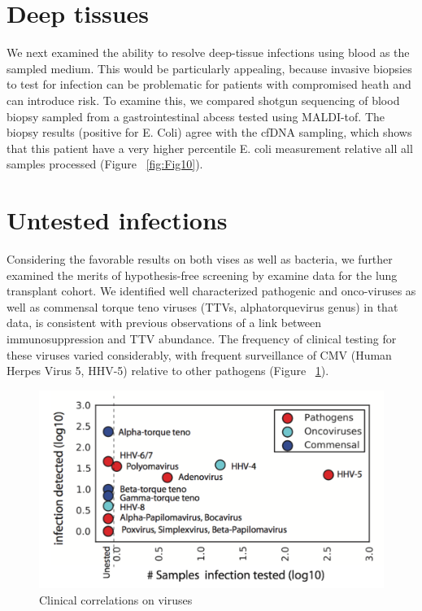 \section{Deep tissues}

We next examined the ability to resolve deep-tissue infections using blood as the sampled medium. This would be particularly appealing, because invasive biopsies to test for infection can be problematic for patients with compromised heath and can introduce risk. To examine this, we compared shotgun sequencing of blood biopsy sampled from a gastrointestinal abcess tested using MALDI-tof. The biopsy results (positive for E. Coli) agree with the cfDNA sampling, which shows that this patient have a very higher percentile E. coli measurement relative all all samples processed (Figure ~\ref{fig:Fig10}).

\section{Untested infections}

Considering the favorable results on both vises as well as bacteria, we further examined the merits of hypothesis-free screening by examine data for the lung transplant cohort. We identified well characterized pathogenic and onco-viruses as well as commensal torque teno viruses (TTVs, alphatorquevirus genus) in that data, is consistent with previous observations of a link between immunosuppression and TTV abundance. The frequency of clinical testing for these viruses varied considerably, with frequent surveillance of CMV (Human Herpes Virus 5, HHV-5) relative to other pathogens (Figure ~\ref{fig:Fig11}). 

\begin{figure}
\center\includegraphics[width=150mm,scale=0.5]{Figures/Fig11}
\caption{Clinical correlations on viruses}
\label{fig:Fig11}
\end{figure}

